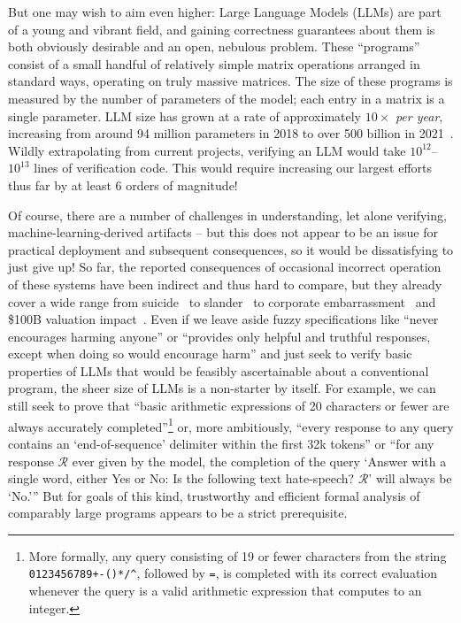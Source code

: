 \documentclass[sn-mathphys,pdflatex]{sn-jnl}%
\theoremstyle{thmstyleone}%
\theoremstyle{thmstyletwo}%
\theoremstyle{thmstylethree}%
\begin{document}
But one may wish to aim even higher: Large Language Models (LLMs) are part of a young and vibrant field, and gaining correctness guarantees about them is both obviously desirable and an open, nebulous problem.
These ``programs'' consist of a small handful of relatively simple matrix operations arranged in standard ways, operating on truly massive matrices.
The size of these programs is measured by the number of parameters of the model; each entry in a matrix is a single parameter.
LLM size has grown at a rate of approximately $10\times$ \emph{per year}, increasing from around 94 million parameters in 2018 to over 500 billion in 2021~\cite{smith2022using}.
Wildly extrapolating from current projects, verifying an LLM would take $10^{12}$--$10^{13}$ lines of verification code.
This would require increasing our largest efforts thus far by at least 6 orders of magnitude!

Of course, there are a number of challenges in understanding, let alone verifying, machine-learning-derived artifacts -- but this does not appear to be an issue for practical deployment and subsequent consequences, so it would be dissatisfying to just give up!
So far, the reported consequences of occasional incorrect operation of these systems have been indirect and thus hard to compare, but they already cover a wide range from suicide~\cite{xiang2023-ai-suicide} to slander~\cite{turley2023chatgpt} to corporate embarrassment~\cite{lee2016learning, hern2016microsoft} and \$100B valuation impact~\cite{coulter2023alphabet}.
Even if we leave aside fuzzy specifications like ``never encourages harming anyone'' or ``provides only helpful and truthful responses, except when doing so would encourage harm'' and just seek to verify basic properties of LLMs that would be feasibly ascertainable about a conventional program, the sheer size of LLMs is a non-starter by itself.
For example, we can still seek to prove that ``basic arithmetic expressions of 20 characters or fewer are always accurately completed''\footnote{%
More formally, any query consisting of 19 or fewer characters from the string \verb|0123456789+-()*/^|, followed by \texttt{=}, is completed with its correct evaluation whenever the query is a valid arithmetic expression that computes to an integer.%
}
or, more ambitiously, ``every response to any query contains an `end-of-sequence' delimiter within the first 32k tokens'' or ``for any response $\mathcal R$ ever given by the model, the completion of the query `Answer with a single word, either Yes or No: Is the following text hate-speech? $\mathcal R$' will always be \mbox{`No.'}''
But for goals of this kind, trustworthy and efficient formal analysis of comparably large programs appears to be a strict prerequisite.
\end{document}
